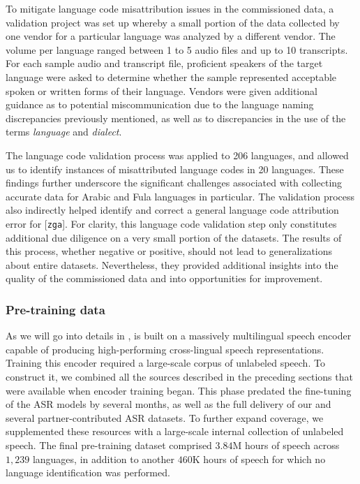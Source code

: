 \documentclass[]{fairmeta}
\begin{document}
To mitigate language code misattribution issues in the commissioned data, a validation project was set up whereby a small portion of the data collected by one vendor for a particular language was analyzed by a different vendor. The volume per language ranged between 1 to 5 audio files and up to 10 transcripts. For each sample audio and transcript file, proficient speakers of the target language were asked to determine whether the sample represented acceptable spoken or written forms of their language. Vendors were given additional guidance as to potential miscommunication due to the language naming discrepancies previously mentioned, as well as to discrepancies in the use of the terms \textit{language} and \textit{dialect}. 

The language code validation process was applied to 206 
languages, and allowed us to identify instances of misattributed language codes in 20 
languages. These findings further underscore the significant challenges associated with collecting accurate data for Arabic and Fula languages in particular. The validation process also indirectly helped identify and correct a general language code attribution error for [\texttt{zga}]. For clarity, this language code validation step only constitutes additional due diligence on a very small portion of the datasets. The results of this process, whether negative or positive, should not lead to generalizations about entire datasets. Nevertheless, they provided additional insights into the quality of the commissioned data and into opportunities for improvement. 

\subsubsection{Pre-training data}
\label{sec:ssl_data}

As we will go into details in , \OmniASR is built on a massively multilingual speech encoder capable of producing high-performing cross-lingual speech representations. 
Training this encoder required a large-scale corpus of unlabeled speech. To construct it, we combined all the sources described in the preceding sections that were available when encoder training began. This phase predated the fine-tuning of the ASR models by several months, as well as the full delivery of our \vendorcorpus  and several partner-contributed ASR datasets.  To further expand coverage, we supplemented these resources with a large-scale internal collection of unlabeled speech.  The final pre-training dataset comprised $3.84\text{M}$ hours of speech across $1{,}239$ languages, in addition to another $460\text{K}$ hours of speech for which no language identification was performed. 
\end{document}

